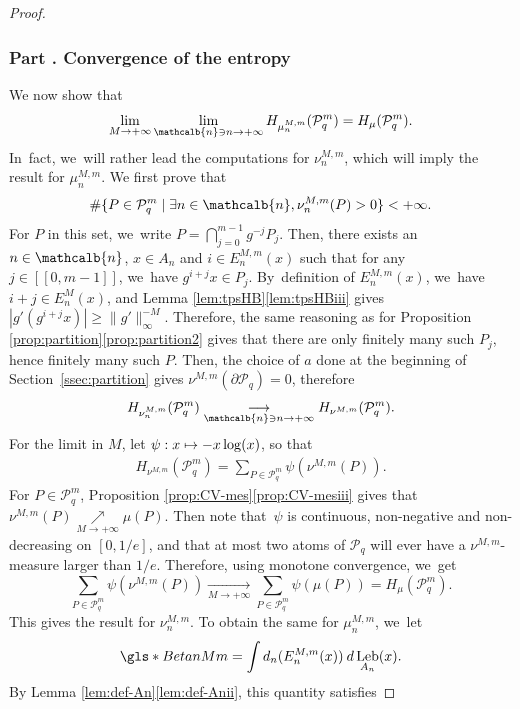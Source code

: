 \documentclass[JEP,XML,SOM,Unicode,NoFloatCountersInSection,published]{cedram}
\renewcommand{\thesubsubsection}{\arabic{subsubsection}}
\newcommand\mto{\mathchoice{\longmapsto}{\mapsto}{\mapsto}{\mapsto}}
\DeclareMathOperator{\Leb}{Leb}
\newcommand{\mcbn}{{\mathcalb{n}}}
\theoremstyle{definition}
\begin{document}
\begin{proof}
\label{part2}
\subsubsection*{Part \thesubsubsection. Convergence of the entropy}

We now show that
\[
\lim_{M \to +\infty} \lim_{\mcbn \ni n \to +\infty} H_{\mu_n^{M,m}}(\mathcal{P}_q^{m}) = H_{\mu}(\mathcal{P}_q^m).
\]
In~fact, we~will rather lead the computations for $\nu_n^{M,m}$, which will imply the result for $\mu_n^{M,m}$.
We first prove that
\[
\# \{ P \in \mathcal{P}_q^{m} \mid \exists n \in \mcbn, \nu_n^{M,m}(P) > 0 \} < +\infty.
\]
For $P$ in this set, we~write $P = \bigcap_{j = 0}^{m-1} g^{-j} P_j$.
Then, there exists an $n \in \mcbn$, $x \in A_n$ and $i \in E_n^{M,m}(x)$ such that for any $j \in [\![ 0, m-1 ]\!]$, we~have $g^{i+j} x \in P_j$. By~definition of $E_n^{M,m}(x)$, we~have $i+j \in E_n^M(x)$, and Lemma \ref{lem:tpsHB}\eqref{lem:tpsHBiii} gives
$|g'(g^{i+j} x)| \geq \| g' \|_{\infty}^{-M}$.
Therefore, the same reasoning as for Proposition \ref{prop:partition}\eqref{prop:partition2} gives that there are only finitely many such $P_j$, hence finitely many such $P$.
Then, the choice of $a$ done at the beginning of Section~\ref{ssec:partition} gives $\nu^{M,m}(\partial \mathcal{P}_q) = 0$, therefore
\[
H_{\nu_n^{M,m}}(\mathcal{P}_q^{m}) \underset{\mcbn \ni n \to +\infty}{\longrightarrow} H_{\nu^{M,m}}(\mathcal{P}_q^m).
\]
For the limit in $M$, let $\psi : x \mto - x \log(x)$, so that
\begin{align*}
H_{\nu^{M,m}}(\mathcal{P}_q^{m})
= \sum_{P \in \mathcal{P}_q^{m}} \psi(\nu^{M,m}(P)).
\end{align*}
For $P \in \mathcal{P}_q^m$, Proposition \ref{prop:CV-mes}\eqref{prop:CV-mesiii} gives that $\nu^{M,m}(P) \!\underset{M \to +\infty}{\nearrow}\! \mu(P)$.
Then note that~$\psi$ is continuous, non-negative and non-decreasing on $[0, 1/e]$, and that at most two atoms of $\mathcal{P}_q$ will ever have a $\nu^{M,m}$-measure larger than $1/e$.
Therefore, using monotone convergence, we~get\vspace*{-3pt}
\[
\sum_{P \in \mathcal{P}_q^{m}} \psi(\nu^{M,m}(P)) \underset{M \to +\infty}{\longrightarrow} \sum_{P \in \mathcal{P}_q^{m}} \psi(\mu(P))
= H_{\mu}(\mathcal{P}_q^m).
\]
This gives the result for $\nu_n^{M,m}$. To obtain the same for $\mu_n^{M,m}$, we~let
\[
\gls*{BetanMm} = \int d_n(E_n^{M,m}(x)) \: d \Leb_{A_n}(x).
\]
By Lemma \ref{lem:def-An}\eqref{lem:def-Anii}, this quantity satisfies\vspace*{-3pt}

\end{proof}
\end{document}
